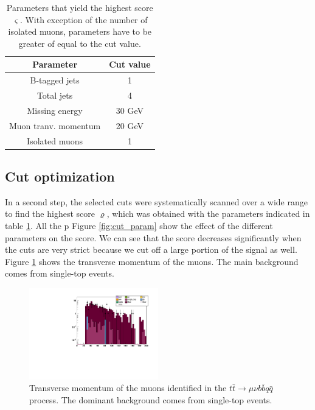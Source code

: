 \documentclass[%
 reprint,
 amsmath,amssymb,
 aps,
]{revtex4-2}
\begin{document}
\begin{table}[b]
    \centering
    \begin{tabular}{|c|c|}
    \hline
    Parameter            & Cut value \\
    \hline
    B-tagged jets        &  1 \\
    Total jets           &  4 \\
    Missing energy       &  30 GeV \\
    Muon tranv. momentum &  20 GeV \\
    Isolated muons       &  1 \\
    \hline
    \end{tabular}
    \caption{Parameters that yield the highest score $\varsigma$. With exception of the number of isolated muons, parameters have to be greater of equal to the cut value. }
    \label{tab:optimal_params}
\end{table}


\subsection{Cut optimization}
In a second step, the selected cuts were systematically scanned over a wide range to find the highest score $\varrho$, which was obtained with the parameters indicated in table \ref{tab:optimal_params}. All the p
Figure \ref{fig:cut_param} show the effect of the different parameters on the score. We can see that the score decreases significantly when the cuts are very strict because we cut off a large portion of the signal as well. 
Figure \ref{fig:muon_pt} shows the transverse momentum of the muons. The main background comes from single-top events. 

\begin{figure}
    \centering
    \includegraphics[width=0.5\textwidth]{Plots/part1/Muon_Pt.pdf}
    \caption{Transverse momentum of the muons identified in the $t \bar t \rightarrow \mu \nu b \bar b q \bar q$ process. The dominant background comes from single-top events.}
    \label{fig:muon_pt}
\end{figure}
\end{document}
